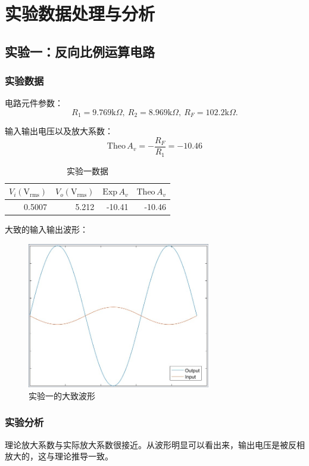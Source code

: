 \documentclass[a4paper,11pt,UTF8]{ctexart}
\newcommand\mr[1]{\mathrm{#1}}
\begin{document}
\section{实验数据处理与分析}
\subsection{实验一：反向比例运算电路}
\subsubsection{实验数据}
电路元件参数：
\[ R_1=9.769\mr{k}\Omega,~R_2=8.969\mr{k}\Omega,~R_F=102.2\mr{k}\Omega. \]
\par 输入输出电压以及放大系数：
\[ \mr{Theo}\,A_v=-\frac{R_F}{R_1}=-10.46 \]
\begin{table}[H]
 \centering
 \begin{tabular}{|r|r|r|r|}
 \hline
  $V_i(\mr{V_{rms}})$ &$V_o(\mr{V_{rms}})$ &$\mr{Exp}\,A_v$ 
  &$\mr{Theo}\,A_v$
  \\\hline
  0.5007 &5.212 &-10.41 &-10.46
  \\\hline
 \end{tabular}
 \caption{实验一数据}
\end{table}
\par 大致的输入输出波形：
\begin{figure}[H]
 \centering
 \includegraphics[width=8cm]{Exp01Wave}
 \caption{实验一的大致波形}
 \label{fig:Exp01Wave}
\end{figure}
\subsubsection{实验分析}
理论放大系数与实际放大系数很接近。从波形明显可以看出来，输出电压是被反相放大的，这与理论推导一致。
\end{document}
